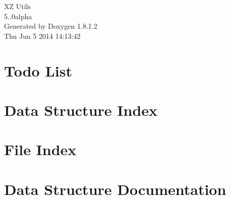 \documentclass{book}
\begin{document}
\begin{titlepage}
\vspace*{7cm}
\begin{center}
{\Large X\-Z Utils \\[1ex]\large 5..\-0alpha }\\
\vspace*{1cm}
{\large Generated by Doxygen 1.8.1.2}\\
\vspace*{0.5cm}
{\small Thu Jun 5 2014 14:13:42}\\
\end{center}
\end{titlepage}
\clearemptydoublepage
{}
\tableofcontents
\clearemptydoublepage
{}
\chapter{Todo List}
\label{todo}

\chapter{Data Structure Index}

\chapter{File Index}

\chapter{Data Structure Documentation}















































\end{document}
